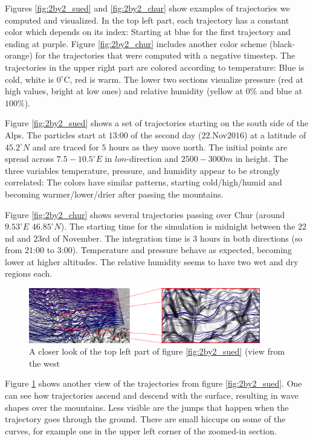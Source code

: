 
Figures \ref{fig:2by2_sued} and \ref{fig:2by2_chur} show examples of trajectories we computed and visualized. In the top left part, each trajectory has a constant color which depends on its index: Starting at blue for the first trajectory and ending at purple. Figure \ref{fig:2by2_chur} includes another color scheme (black-orange) for the trajectories that were computed with a negative timestep. The trajectories in the upper right part are colored according to temperature: Blue is cold, white is $0^{\circ}$C, red is warm. The lower two sections visualize pressure (red at high values, bright at low ones) and relative humidity (yellow at $0 \%$ and blue at $100 \%$).

Figure \ref{fig:2by2_sued} shows a set of trajectories starting on the south side of the Alps. The particles start at $13$:$00$ of the second day ($22. $Nov$ 2016$) at a latitude of $45.2 ^{\circ} N$ and are traced for $5$ hours as they move north. The initial points are spread across $7.5 - 10.5 ^{\circ} E$ in $lon$-direction and $2500 - 3000 m$ in height. The three variables temperature, pressure, and humidity appear to be strongly correlated: The colors have similar patterns, starting cold/high/humid and becoming warmer/lower/drier after passing the mountains.

Figure \ref{fig:2by2_chur} shows several trajectories passing over Chur (around $9.53 ^{\circ}E$ $46.85^{\circ} N$). The starting time for the simulation is midnight between the $22$nd and $23$rd of November. The integration time is $3$ hours in both directions (so from $21$:$00$ to $3$:$00$). Temperature and pressure behave as expected, becoming lower at higher altitudes. The relative humidity seems to have two wet and dry regions each.

\begin{figure}
\centering \includegraphics*[width=0.9\textwidth]{figures/0627_zooming}
\caption{A closer look of the top left part of figure \ref{fig:2by2_sued} (view from the west}
\label{fig:zooming}
\end{figure}
Figure \ref{fig:zooming} shows another view of the trajectories from figure \ref{fig:2by2_sued}. One can see how trajectories ascend and descend with the surface, resulting in wave shapes over the mountains. Less visible are the jumps that happen when the trajectory goes through the ground. There are small hiccups on some of the curves, for example one in the upper left corner of the zoomed-in section.

